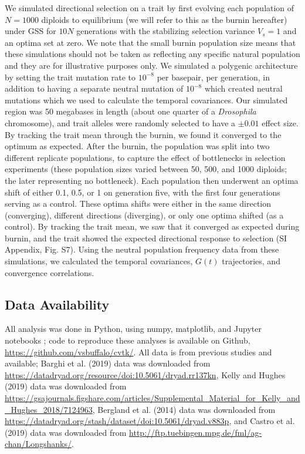 \documentclass[9pt,twocolumn,twoside]{pnas-new}
\begin{document}
{We simulated directional selection on a trait by first evolving each
population of $N=1000$ diploids to equilibrium (we will refer to this as the
burnin hereafter) under GSS for $10N$ generations with the stabilizing
selection variance $V_s = 1$ and an optima set at zero. We note that the small
burnin population size means that these simulations should not be taken as
reflecting any specific natural population and they are for illustrative
purposes only.  We simulated a polygenic architecture by setting the trait
mutation rate to $10^{-8}$ per basepair, per generation, in addition to having
a separate neutral mutation of $10^{-8}$ which created neutral mutations which
we used to calculate the temporal covariances. Our simulated region was 50
megabases in length (about one quarter of a \emph{Drosophila} chromosome), and
trait alleles were randomly selected to have a $\pm 0.01$ effect size. By
tracking the trait mean through the burnin, we found it converged to the
optimum as expected.  After the burnin, the population was split into two
different replicate populations, to capture the effect of bottlenecks in
selection experiments (these population sizes varied between 50, 500, and 1000
diploids; the later representing no bottleneck). Each population then underwent
an optima shift of either 0.1, 0.5, or 1 on generation five, with the first
four generations serving as a control.  These optima shifts were either in the
same direction (converging), different directions (diverging), or only one
optima shifted (as a control). By tracking the trait mean, we saw that it
converged as expected during burnin, and the trait showed the expected
directional response to selection (SI Appendix, Fig. S7).
Using the neutral population frequency data from these simulations, we
calculated the temporal covariances, $G(t)$ trajectories, and convergence
correlations.

\subsection*{Data Availability} 

All analysis was done in Python, using numpy, matplotlib, and Jupyter notebooks
\cite{Rossum1995-ni,Oliphant2006-ul,Kluyver_2016,Hunter2007-ys}; code to
reproduce these analyses is available on Github,
\url{https://github.com/vsbuffalo/cvtk/}. All data is from previous studies and
available; Barghi et al. (2019) data was downloaded from
\url{https://datadryad.org/resource/doi:10.5061/dryad.rr137kn}, Kelly and
Hughes (2019) data was downloaded from
\url{https://gsajournals.figshare.com/articles/Supplemental_Material_for_Kelly_and_Hughes_2018/7124963},
Bergland et al. (2014) data was downloaded from
\url{https://datadryad.org/stash/dataset/doi:10.5061/dryad.v883p}, and Castro
et al. (2019) data was downloaded from
\url{http://ftp.tuebingen.mpg.de/fml/ag-chan/Longshanks/}.  }
\end{document}
